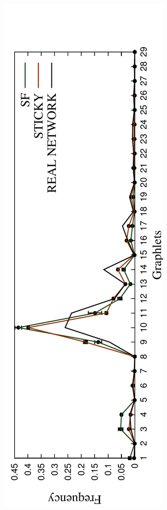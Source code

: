 \begin{figure}[H]
\begin{subfigure}[b]{1.0\textwidth}
  \end{subfigure}
  \begin{subfigure}[b]{1.0\textwidth}
    \includegraphics[angle=-90,scale=0.6]{../code/final_results/human_ppi/avg_egdvs_rnd_spreads_figures/spreads_34_rnd2.pdf} 

\end{subfigure}
\end{figure}
